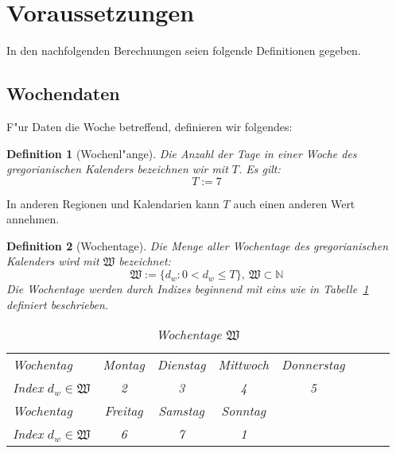 \documentclass[a4paper]{article}
\newcommand*{\wkdays}{\mathfrak{W}}
\numberwithin{equation}{section}
\newtheorem{dfn}{Definition}
\begin{document}
\section{Voraussetzungen}
In den nachfolgenden Berechnungen seien folgende Definitionen gegeben.


%
%
\subsection{Wochendaten}
F"ur Daten die Woche betreffend, definieren wir folgendes:
\begin{dfn}[Wochenl"ange]
Die Anzahl der Tage in einer Woche des gregorianischen Kalenders bezeichnen wir
mit $T$. Es gilt:
\begin{equation}T := 7\end{equation}
\end{dfn}
\noindent In anderen Regionen und Kalendarien kann $T$ auch einen anderen Wert
annehmen.

\begin{dfn}[Wochentage]\label{def:weekdays}
  Die Menge aller Wochentage des gregorianischen Kalenders wird mit $\wkdays$
  bezeichnet:
  \begin{equation}
    \wkdays := \{ d_w : 0 < d_w \le T\},\ \wkdays \subset \mathbb{N}
  \end{equation}
  Die Wochentage werden durch Indizes beginnend mit eins
  wie in Tabelle~\ref{tab:weekDays} definiert
  beschrieben.\footnotemark[\ref{ft:weekdays}]
  \par
  \begin{table}[ht]
  \caption{Wochentage $\wkdays$}\label{tab:weekDays}
  \begin{tabularx}{\textwidth}{X|ccccccc}
    \hline
    Wochentag & Montag & Dienstag & Mittwoch & Donnerstag \\
    Index $d_w \in \wkdays$ & 2 & 3 & 4 & 5 \\
    \hline
    Wochentag & Freitag & Samstag & Sonntag & \\
    Index $d_w \in \wkdays$ & 6 & 7 & 1 & \\
    \hline
  \end{tabularx}\end{table}
\end{dfn}
\end{document}
